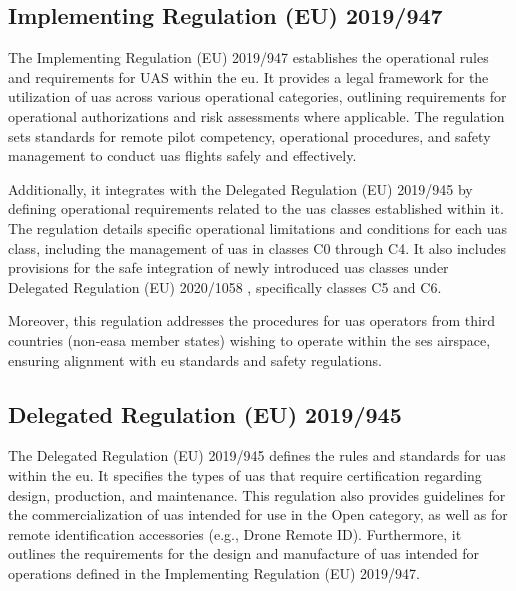 \subsection{Implementing Regulation (EU) 2019/947}
The Implementing Regulation (EU) 2019/947 \autocite{eu-947-2019} establishes the operational rules and requirements for UAS within the \gls{eu}. It provides a legal framework for the utilization of \gls{uas} across various operational categories, outlining requirements for operational authorizations and risk assessments where applicable. The regulation sets standards for remote pilot competency, operational procedures, and safety management to conduct \gls{uas} flights safely and effectively.

Additionally, it integrates with the Delegated Regulation (EU) 2019/945 \autocite{eu-945-2019} by defining operational requirements related to the \gls{uas} classes established within it. The regulation details specific operational limitations and conditions for each \gls{uas} class, including the management of \gls{uas} in classes C0 through C4. It also includes provisions for the safe integration of newly introduced \gls{uas} classes under Delegated Regulation (EU) 2020/1058 \autocite{eu-1058-2020}, specifically classes C5 and C6.

Moreover, this regulation addresses the procedures for \gls{uas} operators from third countries (non-\gls{easa} member states) wishing to operate within the \gls{ses} airspace, ensuring alignment with \gls{eu} standards and safety regulations.

\subsection{Delegated Regulation (EU) 2019/945}
The Delegated Regulation (EU) 2019/945 \autocite{eu-945-2019} defines the rules and standards for \gls{uas} within the \gls{eu}. It specifies the types of \gls{uas} that require certification regarding design, production, and maintenance. This regulation also provides guidelines for the commercialization of \gls{uas} intended for use in the Open category, as well as for remote identification accessories (e.g., Drone Remote ID). Furthermore, it outlines the requirements for the design and manufacture of \gls{uas} intended for operations defined in the Implementing Regulation (EU) 2019/947.

